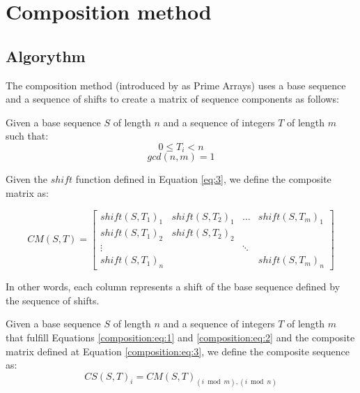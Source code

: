 \section{Composition method}

\subsection{Algorythm}

The composition method (introduced by \citet{tirkel_composition} as Prime
Arrays) uses a base sequence and a sequence of shifts to create a matrix of
sequence components as follows:

\begin{definition}
  Given a base sequence $S$ of length $n$ and a sequence of integers $T$ of
  length $m$ such that:
  \begin{equation}\label{composition:eq:1}
    0 \leq T_{i} < n
  \end{equation}
  \begin{equation}\label{composition:eq:2}
    gcd(n, m) = 1
  \end{equation}

  Given the $shift$ function defined in Equation \eqref{eq:3},
  we define the composite matrix as:

  \begin{equation}\label{composition:eq:3}
    CM(S, T) = \begin{bmatrix}
      shift(S, T_{1})_{1} & shift(S, T_{2})_{1} & \dots & shift(S, T_{m})_{1} \\
      shift(S, T_{1})_{2} & shift(S, T_{2})_{2} \\
      \vdots & & \ddots \\
      shift(S, T_{1})_{n} & & & shift(S, T_{m})_{n}
    \end{bmatrix}
  \end{equation}

  In other words, each column represents a shift of the base sequence defined
  by the sequence of shifts.
\end{definition}

\begin{definition}
  Given a base sequence $S$ of length $n$ and a sequence of integers $T$ of
  length $m$ that fulfill Equations \eqref{composition:eq:1} and
  \eqref{composition:eq:2} and the composite matrix defined at Equation
  \eqref{composition:eq:3}, we define the composite sequence as:
  \begin{equation}
    CS(S, T)_{i} = CM(S, T)_{(i \bmod m), (i \bmod n)}
  \end{equation}
\end{definition}

